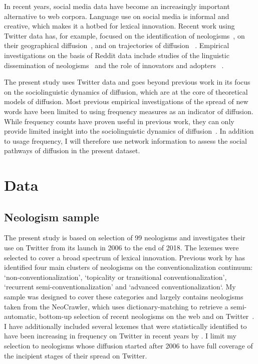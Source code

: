 \documentclass[
  a4paper,
  abstract=on,
  captions=tableabove,
  ]{scrartcl}
\begin{document}
      In recent years, social media data have become an increasingly important alternative to web corpora. Language use on social media is informal and creative, which makes it a hotbed for lexical innovation. Recent work using Twitter data has, for example, focused on the identification of neologisms~\parencite{Grieve2016AnalyzingLexical}, on their geographical diffusion~\parencite{Eisenstein2014DiffusionLexical}, and on trajectories of diffusion~ \textcite{Nini2017ApplicationGrowth}. Empirical investigations on the basis of Reddit data include studies of the linguistic dissemination of neologisms~\parencite{Stewart2018MakingFetch} and the role of innovators and adopters~ \parencite{DelTredici2018RoadSuccess}.

      The present study uses Twitter data and goes beyond previous work in its focus on the sociolinguistic dynamics of diffusion, which are at the core of theoretical models of diffusion. Most previous empirical investigations of the spread of new words have been limited to using frequency measures as an indicator of diffusion. While frequency counts have proven useful in previous work, they can only provide limited insight into the sociolinguistic dynamics of diffusion~\parencite{Stefanowitsch2017CorpusbasedPerspective}. In addition to usage frequency, I will therefore use network information to assess the social pathways of diffusion in the present dataset. 
          
\section{Data}
  \label{sec:data}

  \subsection{Neologism sample}
    \label{subsec:neo-sample}

  The present study is based on selection of 99 neologisms and investigates their use on Twitter from its launch in 2006 to the end of 2018. The lexemes were selected to cover a broad spectrum of lexical innovation. Previous work by \textcite[115--147]{Kerremans2015WebNew} has identified four main clusters of neologisms on the conventionalization continuum: `non-conventionalization', `topicality or transitional conventionalization', `recurrent semi-conventionalization' and `advanced conventionalization`. My sample was designed to cover these categories and largely contains neologisms taken from the NeoCrawler, which uses dictionary-matching to retrieve a semi-automatic, bottom-up selection of recent neologisms on the web and on Twitter~\parencite{Kerremans2019UsingDatamining}. I have additionally included several lexemes that were statistically identified to have been increasing in frequency on Twitter in recent years by \textcite{Grieve2016AnalyzingLexical}. I limit my selection to neologisms whose diffusion started after 2006 to have full coverage of the incipient stages of their spread on Twitter.
\end{document}
